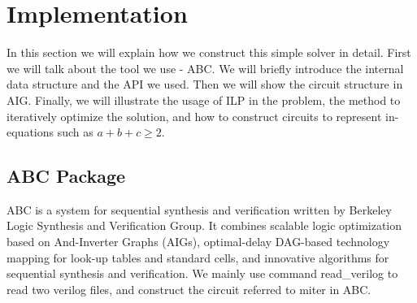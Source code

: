 \section{Implementation}
In this section we will explain how we construct this simple solver in detail. First we will talk about the tool we use - ABC. We will briefly introduce the internal data structure and the API we used. Then we will show the circuit structure in AIG. Finally, we will illustrate the usage of ILP in the problem, the method to iteratively optimize the solution, and how to construct circuits to represent in-equations such as $a+b+c \geq 2$.
\subsection{ABC Package}
ABC is a system for sequential synthesis and verification written by Berkeley Logic Synthesis and Verification Group. It combines scalable logic optimization based on And-Inverter Graphs (AIGs), optimal-delay DAG-based technology mapping for look-up tables and standard cells, and innovative algorithms for sequential synthesis and verification.
We mainly use command read\_verilog to read two verilog files, and construct the circuit referred to miter in ABC.

